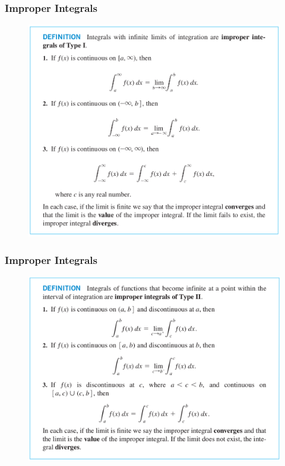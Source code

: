 \documentclass[xcolor=dvipsnames]{beamer}
\begin{document}
\begin{frame}
  \frametitle{Improper Integrals}
  \begin{figure}[h]
    \includegraphics[scale=0.3]{./diagrams/improper3.png}
  \end{figure}
\end{frame}

\begin{frame}
  \frametitle{Improper Integrals}
  \begin{figure}[h]
    \includegraphics[scale=0.28]{./diagrams/improper4.png}
  \end{figure}
\end{frame}
\end{document}
